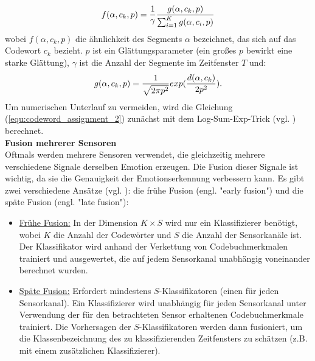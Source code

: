 \begin{equation} 
\Large{ {f(\alpha,c_k,p) = \frac{1}{\gamma}} \frac{g(\alpha,c_k,p)}{\sum_{i=1}^{K} g(\alpha,c_i,p)}}
\end{equation}
\newline
wobei $f(\alpha,c_k,p)$ die {\"a}hnlichkeit des Segments $\alpha$ bezeichnet, das sich auf das Codewort $c_k$ bezieht. $p$ ist ein Gl{\"a}ttungsparameter (ein gro{\ss}es $p$ bewirkt eine starke Gl{\"a}ttung), $\gamma$ ist die Anzahl der Segmente im Zeitfenster $T$ und: \\
\begin{equation} 
\Large{ { g(\alpha,c_k,p) = \frac{1}{\sqrt{2 \pi p^{ 2 }}}} exp(\frac{d(\alpha,c_k)}{2p^{2}}). }
\label{equ:codeword_assignment_2} \end{equation}
\newline
Um numerischen Unterlauf zu vermeiden, wird die Gleichung (\ref{equ:codeword_assignment_2}) zun{\"a}chst mit dem Log-Sum-Exp-Trick (vgl. \cite{murphy_2012}) berechnet. \\




\textbf{Fusion mehrerer Sensoren \\}
Oftmals werden mehrere Sensoren verwendet, die gleichzeitig mehrere verschiedene Signale derselben Emotion erzeugen.
Die Fusion dieser Signale ist wichtig, da sie die Genauigkeit der Emotionserkennung verbessern kann.
Es gibt zwei verschiedene Ans{\"a}tze (vgl. \cite{snoek_2005}): die fr{\"u}he Fusion (engl. "early fusion") und die sp{\"a}te Fusion (engl. "late fusion"): 

\begin{itemize}
  \item \underline{Fr{\"u}he Fusion:} In der Dimension $K \times S$ wird nur ein Klassifizierer ben{\"o}tigt, wobei $K$ die Anzahl der Codew{\"o}rter und $S$ die Anzahl der Sensorkan{\"a}le ist. Der Klassifikator wird anhand der Verkettung von Codebuchmerkmalen trainiert und ausgewertet, die auf jedem Sensorkanal unabh{\"a}ngig voneinander berechnet wurden.

  \item \underline{Sp{\"a}te Fusion:} Erfordert mindestens $S$-Klassifikatoren (einen f{\"u}r jeden Sensorkanal). Ein Klassifizierer wird unabh{\"a}ngig f{\"u}r jeden Sensorkanal unter Verwendung der f{\"u}r den betrachteten Sensor erhaltenen Codebuchmerkmale trainiert. Die Vorhersagen der $S$-Klassifikatoren werden dann fusioniert, um die Klassenbezeichnung des zu klassifizierenden Zeitfensters zu sch{\"a}tzen (z.B. mit einem zus{\"a}tzlichen Klassifizierer).
\end{itemize} \vspace{0.5cm}


